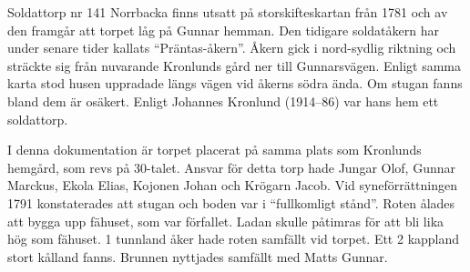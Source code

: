 %
Soldattorp nr 141 Norrbacka finns utsatt på storskifteskartan från 1781 och av den framgår att torpet låg på Gunnar hemman. Den tidigare soldatåkern har under senare tider kallats ``Präntas-åkern''. Åkern gick i nord-sydlig riktning och sträckte sig från nuvarande Kronlunds gård ner till Gunnarsvägen. Enligt samma karta stod husen uppradade längs vägen vid åkerns södra ända. Om stugan fanns bland dem är osäkert. Enligt Johannes Kronlund (1914--86) var hans hem ett soldattorp.

I denna dokumentation är torpet placerat på samma plats som Kronlunds hemgård, som revs på 30-talet. Ansvar för detta torp hade Jungar Olof, Gunnar Marckus, Ekola Elias, Kojonen Johan och Krögarn Jacob. Vid syneförrättningen 1791 konstaterades att stugan och boden var i ``fullkomligt stånd''. Roten ålades att bygga upp fähuset, som var förfallet. Ladan skulle påtimras för att bli lika hög som fähuset. 1 tunnland åker hade roten samfällt vid torpet. Ett 2 kappland stort kålland fanns. Brunnen nyttjades samfällt med Matts Gunnar.


